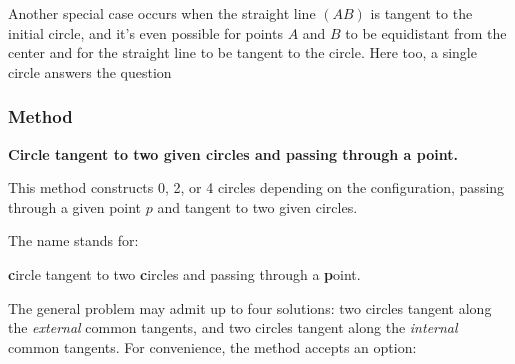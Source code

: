 Another special case occurs when the straight line $(AB)$ is tangent to the initial circle, and it's even possible for points $A$ and $B$ to be equidistant from the center and for the straight line to be tangent to the circle. Here too, a single circle answers the question

\begin{minipage}{.5\textwidth}
\begin{center}
 \end{center}
\end{minipage}
\begin{minipage}{.5\textwidth}
\begin{tkzexample}
\end{tkzexample}
\end{minipage}

\subsubsection{Method }
\label{ssub:method_c_cc_p}
\textbf{Circle tangent to two given circles and passing through a point.}

This method constructs 0, 2, or 4 circles depending on the configuration, passing through a given point $p$ and tangent to two given circles.


\medskip
\noindent
The name  stands for:

\begin{center}
\textbf{c}ircle tangent to two \textbf{c}ircles and passing through a \textbf{p}oint.
\end{center}

\medskip
\noindent
The general problem may admit up to four solutions: two circles tangent along the \emph{external} common tangents, and two circles tangent along the \emph{internal} common tangents.
For convenience, the method accepts an option:

